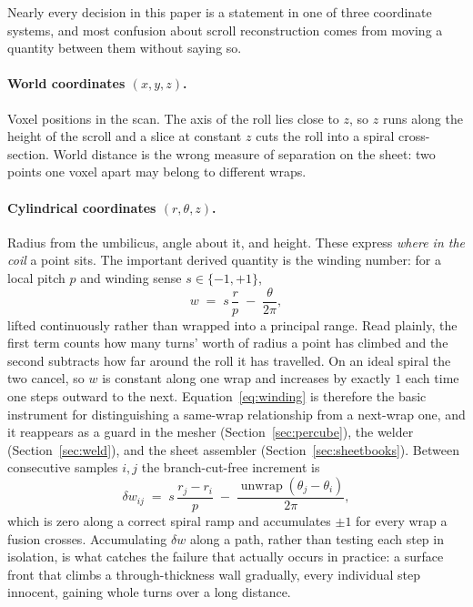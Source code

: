 Nearly every decision in this paper is a statement in one of three coordinate systems, and most confusion about scroll reconstruction comes from moving a quantity between them without saying so.

\paragraph{World coordinates $(x,y,z)$.} Voxel positions in the scan. The axis of the roll lies close to $z$, so $z$ runs along the height of the scroll and a slice at constant $z$ cuts the roll into a spiral cross-section. World distance is the wrong measure of separation on the sheet: two points one voxel apart may belong to different wraps.

\paragraph{Cylindrical coordinates $(r,\theta,z)$.} Radius from the umbilicus, angle about it, and height. These express \emph{where in the coil} a point sits. The important derived quantity is the winding number: for a local pitch $p$ and winding sense $s\in\{-1,+1\}$,
\begin{equation}
  w \;=\; s\,\frac{r}{p} \;-\; \frac{\theta}{2\pi},
  \label{eq:winding}
\end{equation}
lifted continuously rather than wrapped into a principal range. Read plainly, the first term counts how many turns' worth of radius a point has climbed and the second subtracts how far around the roll it has travelled. On an ideal spiral the two cancel, so $w$ is constant along one wrap and increases by exactly $1$ each time one steps outward to the next. Equation~\eqref{eq:winding} is therefore the basic instrument for distinguishing a same-wrap relationship from a next-wrap one, and it reappears as a guard in the mesher (Section~\ref{sec:percube}), the welder (Section~\ref{sec:weld}), and the sheet assembler (Section~\ref{sec:sheetbooks}). Between consecutive samples $i,j$ the branch-cut-free increment is
\begin{equation*}
  \delta w_{ij} \;=\; s\,\frac{r_j-r_i}{p} \;-\; \frac{\operatorname{unwrap}(\theta_j-\theta_i)}{2\pi},
\end{equation*}
which is zero along a correct spiral ramp and accumulates $\pm 1$ for every wrap a fusion crosses. Accumulating $\delta w$ along a path, rather than testing each step in isolation, is what catches the failure that actually occurs in practice: a surface front that climbs a through-thickness wall gradually, every individual step innocent, gaining whole turns over a long distance.

